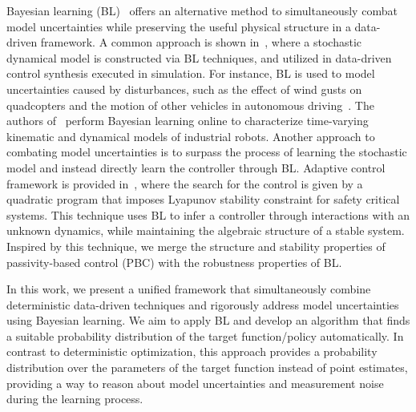 Bayesian learning (BL)~\cite{gal2016improving,thakur} offers an alternative method to
simultaneously combat model uncertainties while preserving the useful physical
structure in a data-driven framework.
%
A common approach is shown in~\cite{sadigh2015safe, shen2022online,
pmlr-v54-linderman17a}, where a stochastic dynamical model is constructed via BL
techniques, and utilized in data-driven control synthesis executed in
simulation. 
%
For instance, BL is used to model uncertainties caused by disturbances, such as
the effect of wind gusts on quadcopters and the motion of other vehicles in
autonomous driving~\cite{sadigh2015safe}. 
%
The authors of~\cite{shen2022online} perform Bayesian learning online to
characterize time-varying kinematic and dynamical models of industrial robots.
%
Another approach to combating model uncertainties is to surpass the process of
learning the stochastic model and instead directly learn the controller through
BL. 
%
Adaptive control framework is provided in~\cite{fan2020bayesian}, where the
search for the control is given by a quadratic program that imposes
Lyapunov stability constraint for safety critical systems.
%
This technique uses BL to infer a controller through interactions with an
unknown dynamics, while maintaining the algebraic structure of a stable system.
%
Inspired by this technique, we merge the structure and stability properties of
passivity-based control (PBC) with the robustness properties of BL.  


In this work, we present a unified framework that simultaneously combine
deterministic data-driven techniques and rigorously address model uncertainties
using Bayesian learning.
%
We aim to apply BL and develop an algorithm that finds a suitable probability
distribution of the target function/policy automatically.
%
In contrast to deterministic optimization, this approach provides a probability
distribution over the parameters of the target function instead of point
estimates, providing a way to reason about model uncertainties and measurement
noise during the learning process.
%